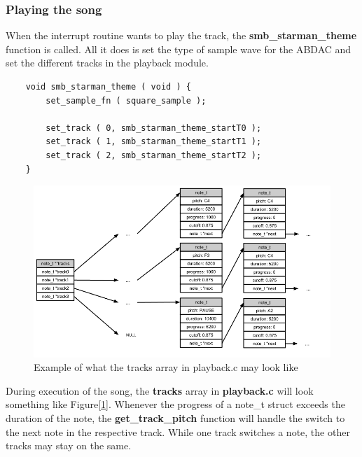 \subsubsection{Playing the song}
When the interrupt routine wants to play the track, the \textbf{smb\_starman\_theme} function 
is called. All it does is set the type of sample wave for the ABDAC and set the 
different tracks in the playback module.
\begin{lstlisting}
	void smb_starman_theme ( void ) {
		set_sample_fn ( square_sample );

		set_track ( 0, smb_starman_theme_startT0 );
		set_track ( 1, smb_starman_theme_startT1 );
		set_track ( 2, smb_starman_theme_startT2 );
	}
\end{lstlisting}
\begin{figure}[h]
	\centerline{{\includegraphics[width=480px]{tracks_example02.png}}}
	\caption{Example of what the tracks array in playback.c may look like}
	\label{tracks-example}
\end{figure}
During execution of the song, the \textbf{tracks} array in \textbf{playback.c} 
will look something like Figure[\ref{tracks-example}].
Whenever the progress of a note\_t struct exceeds the duration of the note, 
the \textbf{get\_track\_pitch} function will handle the switch 
to the next note in the respective track. While one
track switches a note, the other tracks may stay on the same.